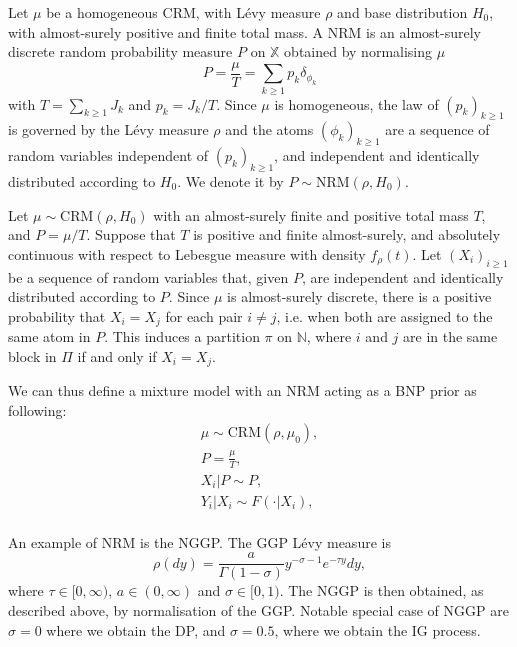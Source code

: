 \begin{definition} \label{def:NRM}
Let $\mu$ be a homogeneous \gls{CRM}, with Lévy measure $\rho$ and base distribution $H_0$, with almost-surely positive and finite total mass. A \gls{NRM} is an almost-surely discrete random probability measure $P$ on $\mathbb{X}$ obtained by normalising $\mu$
$$ P = \frac{\mu}{T} = \sum_{k \ge 1}{p_k \delta_{\phi_k}} $$
with $T = \sum_{k \ge 1}{J_k}$ and $p_k = J_k / T$.
Since $\mu$ is homogeneous, the law of $\left(p_k \right)_{k \ge 1}$ is governed by the Lévy measure $\rho$ and the atoms $\left(\phi_k \right)_{k \ge 1}$ are a sequence of random variables independent of $\left(p_k \right)_{k \ge 1}$, and independent and identically distributed according to $H_0$.
We denote it by $P \sim \text{NRM}(\rho, H_0)$. \\
\end{definition}

Let $\mu \sim \text{CRM}(\rho, H_0)$ with an almost-surely finite and positive total mass $T$, and $P = \mu / T$. Suppose that $T$ is positive and finite almost-surely, and absolutely continuous with respect to Lebesgue measure with density $f_\rho(t)$.
Let $(X_i)_{i \ge 1}$ be a sequence of random variables that, given $P$, are independent and identically distributed according to $P$. Since $\mu$ is almost-surely discrete, there is a positive probability that $X_i = X_j$ for each pair $i \neq j$, i.e. when both are assigned to the same atom in $P$. This induces a partition $\pi$ on $\mathbb{N}$, where $i$ and $j$ are in the same block in $\Pi$ if and only if $X_i = X_j$.

We can thus define a mixture model with an \gls{NRM} acting as a \gls{BNP} prior as following:
\begin{gather*}
\mu \sim \text{CRM}(\rho, \mu_0), \\
P = \frac{\mu}{T}, \\
X_i|P \sim P, \\
Y_i|X_i \sim F(\cdot|X_i), \\
\end{gather*}

An example of \gls{NRM} is the \gls{NGGP}. The GGP Lévy measure is
\begin{equation} \label{eq:GGP}
\rho(dy) = \frac{a}{\Gamma(1 - \sigma)}y^{-\sigma-1}e^{-\tau y} dy,
\end{equation}
where $\tau \in [0,\infty)$, $a \in (0, \infty)$ and $\sigma \in [0, 1)$. The \gls{NGGP} is then obtained, as described above, by normalisation of the GGP. Notable special case of \gls{NGGP} are $\sigma = 0$ where we obtain the \gls{DP}, and $\sigma=0.5$, where we obtain the \gls{IG} process.

